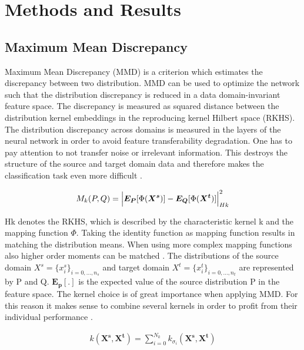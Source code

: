 
\chapter{Methods and Results}\label{chapter:introduction}


\section{Maximum Mean Discrepancy}
Maximum Mean Discrepancy (MMD) is a criterion which estimates the discrepancy between two distribution. MMD can be used to optimize the network such that the distribution discrepancy is reduced in a data domain-invariant feature space. The discrepancy is measured as squared distance between the distribution kernel embeddings in the reproducing kernel Hilbert space (RKHS). The distribution discrepancy across domains is measured in the layers of the neural network in order to avoid feature transferability degradation. One has to pay attention to not transfer noise or irrelevant information. This destroys the structure of the source and target domain data and therefore makes the classification task even more difficult \cite{li2020domain}. 

\begin{align}
    M_{k}(P,Q) = \Bigl|  \boldsymbol{E_{P}}[\Phi(\boldsymbol{X^{s}})] - \boldsymbol{E_{Q}}[\Phi(\boldsymbol{X^{t}})]     \Bigl|^{2}_{Hk}
\end{align}

Hk denotes the RKHS, which is described by the characteristic kernel k and the mapping function $\Phi$. Taking the identity function as mapping function results in matching the distribution means. When using more complex mapping functions also higher order moments can be matched \cite{Yujia2015}. The distributions of the source domain $X^{s} = \{{x}_{i}^{s}\}_{i=0,...,n_{s}}$ and target domain $X^{t} = \{{x}_{i}^{t}\}_{i=0,...,n_{t}}$ are represented by P and Q. $\boldsymbol{E_{p}[.]}$ is the expected value of the source distribution P in the feature space. The kernel choice is of great importance when applying MMD. For this reason it makes sense to combine several kernels in order to profit from their individual performance \cite{li2020domain}.

\begin{align}
    k(\boldsymbol{X^{s}}, \boldsymbol{X^{t}}) = \sum_{i=0}^{N_{k}} k_{\sigma_{i}}(\boldsymbol{X^{s}}, \boldsymbol{X^{t}})
\end{align}

